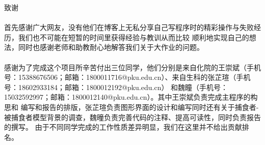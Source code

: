 \documentclass[a4paper]{ctexart}
\makeatletter
\renewcommand{\section}{\@startsection{section}{1}{0mm}
	{-\baselineskip}{0.5\baselineskip}{\bf\leftline}}
\makeatother
\begin{document}
	\section{\Large{致谢}}
	\paragraph{}
	首先感谢广大网友，没有他们在博客上无私分享自己写程序时的精彩操作与失败经历，我们也不可能在短暂的时间里获得经验与教训从而比较
	顺利地实现自己的想法，同时也感谢老师和助教耐心地解答我们关于大作业的问题。
	\paragraph{}
	感谢为了完成这个项目所辛苦付出三位同学，他们分别是来自化院的王崇斌（手机号：15388676506；邮箱：1800011716@pku.edu.cn）、来自生科的张芷瑄（手机号：18602933184；邮箱：1800012192@pku.edu.cn）
	和魏瞳（手机号：15032592997；邮箱：1800012140@pku.edu.cn）。其中王崇斌负责完成主程序的构思和
	编写和报告的排版，张芷瑄负责图形界面的设计和编写同时还有关于捕食者-被捕食者模型背景的调查，魏曈负责完善代码的注释、提高可读性，同时负责报告的撰写。
	由于不同同学完成的工作性质差异明显，我们在这里并不给出贡献排名。
\end{document}
